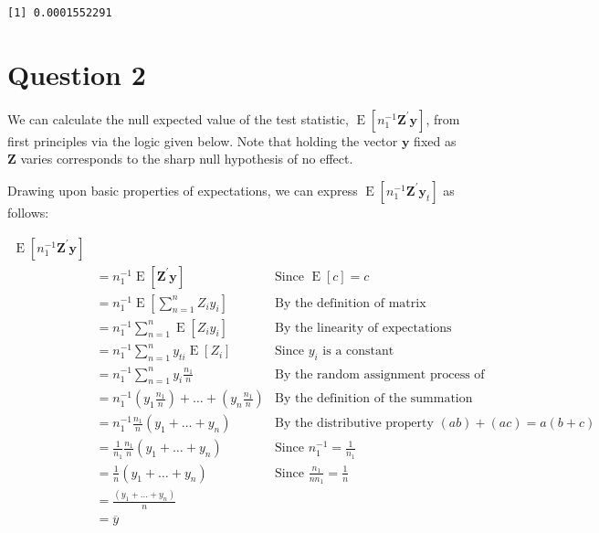 \documentclass[
  12pt,
  leqno]{article}
\DeclareMathOperator{\E}{\mathrm{E}}
\DeclareMathOperator{\1}{\mathbbm{1}}
\begin{document}
\begin{verbatim}
[1] 0.0001552291
\end{verbatim}

\normalsize
\section*{Question 2}

We can calculate the null expected value of the test statistic,
\(\E\left[n_1^{-1} \mathbf{Z}^{\prime}\mathbf{y}\right]\), from first
principles via the logic given below. Note that holding the vector
\(\mathbf{y}\) fixed as \(\mathbf{Z}\) varies corresponds to the sharp
null hypothesis of no effect.

Drawing upon basic properties of expectations, we can express
\(\E\left[n_1^{-1} \mathbf{Z}^{\prime}\mathbf{y}_t\right]\) as follows:

\begin{align*}
\E\left[n_1^{-1} \mathbf{Z}^{\prime}\mathbf{y}\right] \\
& = n_1^{-1} \E\left[\mathbf{Z}^{\prime}\mathbf{y}\right] & \text{Since } \E\left[c\right] = c \\
& = n_1^{-1} \E\left[\sum \limits_{n = 1}^n Z_i y_{i}\right] & \text{By the definition of matrix multiplication} \\
& = n_1^{-1} \sum \limits_{n = 1}^n \E\left[Z_i y_{i}\right] & \text{By the linearity of expectations} \\
& = n_1^{-1} \sum \limits_{n = 1}^n y_{ti} \E\left[Z_i\right] & \text{Since } y_{i} \text{ is a constant} \\
& = n_1^{-1} \sum \limits_{n = 1}^n y_{i} \frac{n_1}{n} & \text{By the random assignment process of the experiment} \\
& = n_1^{-1}  \left(y_{1} \frac{n_1}{n}\right) + \dots + \left(y_{n} \frac{n_1}{n}\right) & \text{By the definition of the summation operator} \\
& = n_1^{-1} \frac{n_1}{n} \left(y_{1} + \dots + y_{n}\right) & \text{By the distributive property } (a b) + (a  c) = a(b + c) \\
& = \frac{1}{n_1} \frac{n_1}{n} \left(y_{1} + \dots + y_{n}\right) & \text{Since } n_1^{-1} = \frac{1}{n_1} \\
& = \frac{1}{n} \left(y_{1} + \dots + y_{n}\right) & \text{Since } \frac{n_1}{n n_1} = \frac{1}{n} \\
& = \frac{\left(y_{1} + \dots + y_{n}\right)}{n} \\
& = \overline{y}
\end{align*}
\end{document}
